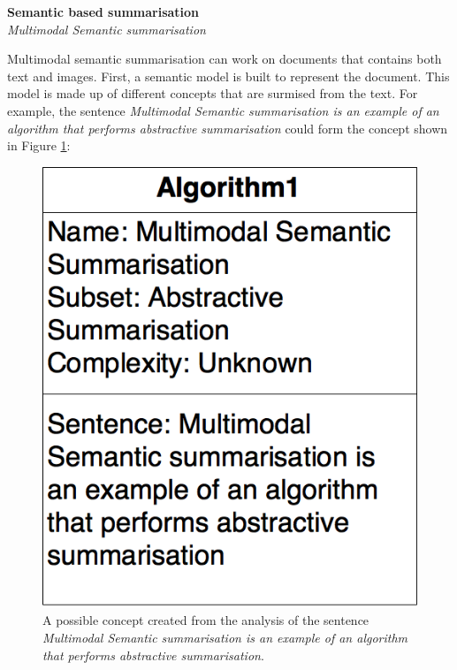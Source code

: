 \documentclass[12pt]{article}
\begin{document}
\textbf{Semantic based summarisation} \\

\emph{Multimodal Semantic summarisation}

Multimodal semantic summarisation can work on documents that contains both text and images. First, a semantic model is built to represent the document. This model is made up of different concepts that are surmised from the text. For example, the sentence \emph{Multimodal Semantic summarisation is an example of an algorithm that performs abstractive summarisation} could form the concept shown in Figure \ref{multimodalSummarisation}:

\begin{figure}[ht!]
  \centering
    \includegraphics[scale=0.3]{MultimodalSummarisation.png}
   \caption[A concept created during multimodal semantic summarisation]{A possible concept created from the analysis of the sentence \emph{Multimodal Semantic summarisation is an example of an algorithm that performs abstractive summarisation}.}
   \label{multimodalSummarisation}
\end{figure}
\end{document}
